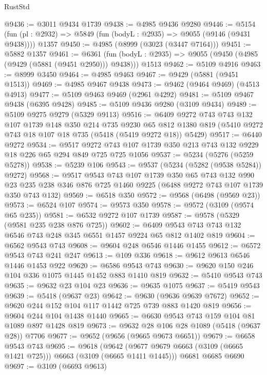 \begin{lexlean}{RustStd}
\begin{coremodule}
@9436 := @3011 @9434 @1739
@9438 := @4985 @9436 @9280
@9446 := @5154
    (fun (pl : @2932) => @5849 (fun (bodyL : @2935) => @9055 (@9146 (@9431 @9438))))
    @1357
@9450 := @4985 (@8999 (@3023 (@3447 @7164)))
@9451 := @5882 @1357
@9461 := @6361
    (fun (bodyL : @2935) => @9055 (@9450 (@4985 (@9429 (@5881 (@9451 @2950))) @9438)))
    @1513
@9462 := @5109 @4916
@9463 := @8999 @3450
@9464 := @4985 @9463
@9467 := @9429 (@5881 (@9451 @1513))
@9469 := @4985 @9467 @9438
@9473 := @9462 (@9464 @9469) (@4513 @4913)
@9477 := @5109 @9463 @9469 (@2961 @4292)
@9481 := @5109 @9467 @9438 (@6395 @9428)
@9485 := @5109 @9436 @9280 (@3109 @9434)
@9489 := @5109 @9275 @9279 (@5329 @9113)
@9516 := @6409
    @9272
    @743
    @743
    @132
    @107
    @1739
    @148
    @350
    @214
    @735
    @9230
    @65
    @812
    @1380
    @819
    (@5410 @9272 @743 @18 @107 @18 @735 (@5418 (@5419 @9272 @18)) @5429)
@9517 := @6440 @9272
@9534 := @9517
    @9272
    @743
    @107
    @1739
    @350
    @213
    @743
    @132
    @9229
    @18
    @226
    @65
    @294
    @849
    @725
    @725
    @1056
@9537 := @5234 (@5276 (@5259 @5278))
@9538 := @5239 @106
@9543 := @9537 (@5234 (@5282 (@9538 @5284)) @9272)
@9568 := @9517
    @9543
    @743
    @107
    @1739
    @350
    @65
    @743
    @132
    @990
    @23
    @235
    @238
    @346
    @876
    @725
    @1460
    @9225
    (@6488 @9272 @743 @107 @1739 @350 @743 @132)
@9569 := @6518 @350
@9572 := @9568 (@6498 (@9569 @23))
@9573 := @6524 @107
@9574 := @9573 @350
@9578 := @9572 (@3109 (@9574 @65 @235))
@9581 := @6532 @9272 @107 @1739
@9587 := @9578 (@5329 (@9581 @235 @238 @876 @725))
@9602 := @6409 @9543 @743 @743 @132 @6546 @743 @248 @345 @6551 @1457 @9224 @65 @812 @1402 @819
@9604 := @6562 @9543 @743
@9608 := @9604 @248 @6546 @1446 @1455
@9612 := @6572 @9543 @743 @241 @247
@9613 := @109 @336
@9618 := @9612 @9613 @6546 @1446 @1453 @922
@9620 := @6586 @9543 @743
@9630 := @9620 @150 @246 @104 @336 @1075 @1445 @1452 @883 @1410 @819
@9632 := @5410 @9543 @743
@9635 := @9632 @23 @104 @23
@9636 := @9635 @1075
@9637 := @5419 @9543
@9639 := @5418 (@9637 @23)
@9642 := @9630 (@9636 @9639 @7672)
@9652 := @9620 @244 @152 @104 @117 @1442 @725 @739 @883 @1420 @819
@9656 := @9604 @244 @104 @1438 @1440
@9665 := @6630 @9543 @743 @159 @104 @81 @1089 @897 @1428 @819
@9673 := @9632 @28 @106 @28 @1089 (@5418 (@9637 @28)) @7706
@9677 := @9652 (@9656 (@9665 @9673 @6651))
@9679 := @6658 @9543 @743
@9695 := @9618
    (@9642 (@9677 @9679 @6663 (@3109 (@6665 @1421 @725))) @6663 (@3109 (@6665 @1411 @1445)))
    @6681
    @6685
    @6690
@9697 := @3109 (@6693 @9613)

\end{coremodule}
\end{lexlean}
